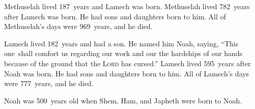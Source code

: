 \begin{inparaenum}
     Methuselah lived 187~years and Lamech was born.%
     Methuselah lived 782~years after Lamech was born. He had sons and daughters born to him.%
     All of Methuselah's days were 969~years, and he died.%
    
     Lamech lived 182~years and had a son.%
     He named him Noah, saying, ``This one\understood\ shall comfort us regarding our work and our the hardships of our hands because of the ground that the \textsc{Lord} has cursed.''%
     Lamech lived 595~years after Noah was born. He had sons and daughters born to him.%
     All of Lamech's days were 777~years, and he died.%
    
     Noah was 500~years old when Shem, Ham, and Japheth were born to Noah.%
\end{inparaenum}
